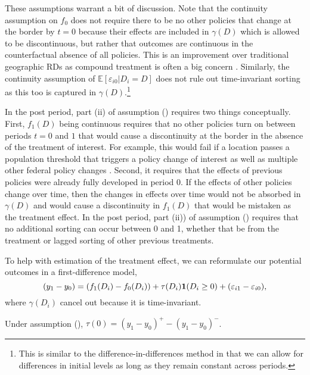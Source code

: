 \documentclass[12pt]{article}
\begin{document}
These assumptions warrant a bit of discussion. Note that the continuity assumption on $f_0$ does not require there to be no other policies that change at the border by $t=0$ because their effects are included in $\gamma(D)$ which is allowed to be discontinuous, but rather that outcomes are continuous in the counterfactual absence of all policies. This is an improvement over traditional geographic RDs as compound treatment is often a big concern \citep{Keele_Titiunik_2015}. Similarly, the continuity assumption of $\mathbb{E}\left[ \varepsilon_{i0} \vert D_i = D \right]$ does not rule out time-invariant sorting as this too is captured in $\gamma(D)$.\footnote{This is similar to the difference-in-differences method in that we can allow for differences in initial levels as long as they remain constant across periods.} 

In the post period, part (ii) of assumption () requires two things conceptually. First, $f_1(D)$ being continuous requires that no other policies turn on between periods $t=0$ and $1$ that would cause a discontinuity at the border in the absence of the treatment of interest. For example, this would fail if a location passes a population threshold that triggers a policy change of interest as well as multiple other federal policy changes \citep{Eggers_Freier_Grembi_Nannicini_2018}. Second, it requires that the effects of previous policies were already fully developed in period 0. If the effects of other policies change over time, then the changes in effects over time would not be absorbed in $\gamma(D)$ and would cause a discontinuity in $f_1(D)$ that would be mistaken as the treatment effect. In the post period, part (ii)) of assumption () requires that no additional sorting can occur between 0 and 1, whether that be from the treatment or lagged sorting of other previous treatments.

To help with estimation of the treatment effect, we can reformulate our potential outcomes in a first-difference model, $$
    (y_1 - y_0) = (f_1(D_i) - f_0(D_i)) + \tau(D_i)\mathbf{1}(D_i \geq 0) + (\varepsilon_{i1} - \varepsilon_{i0}),
$$
where $\gamma(D_i)$ cancel out because it is time-invariant. 

\begin{theorem}
    Under assumption (), $\tau(0) = (y_1 - y_0)^+ - (y_1 - y_0)^-$.
\end{theorem}
\end{document}
